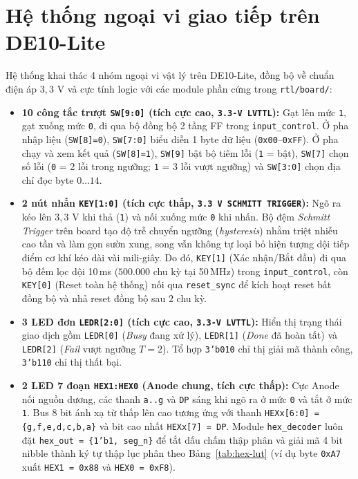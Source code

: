 \documentclass[11pt,a4paper]{report}
\begin{document}
\section{Hệ thống ngoại vi giao tiếp trên DE10-Lite}
\label{sec:peripherals}

Hệ thống khai thác 4 nhóm ngoại vi vật lý trên DE10-Lite, đồng bộ về chuẩn điện áp $3{,}3\text{ V}$ và cực tính logic với các module phần cứng trong \texttt{rtl/board/}:
\begin{itemize}
    \item \textbf{10 công tắc trượt \texttt{SW[9:0]} (tích cực cao, \texttt{3.3-V LVTTL}):} Gạt lên mức \texttt{1}, gạt xuống mức \texttt{0}, đi qua bộ đồng bộ 2 tầng FF trong \texttt{input\_control}. Ở pha nhập liệu (\texttt{SW[8]=0}), \texttt{SW[7:0]} biểu diễn 1 byte dữ liệu (\texttt{0x00}--\texttt{0xFF}). Ở pha chạy và xem kết quả (\texttt{SW[8]=1}), \texttt{SW[9]} bật bộ tiêm lỗi (\texttt{1} = bật), \texttt{SW[7]} chọn số lỗi (\texttt{0} = 2 lỗi trong ngưỡng; \texttt{1} = 3 lỗi vượt ngưỡng) và \texttt{SW[3:0]} chọn địa chỉ đọc byte $0\dots 14$.
    \item \textbf{2 nút nhấn \texttt{KEY[1:0]} (tích cực thấp, \texttt{3.3 V SCHMITT TRIGGER}):} Ngõ ra kéo lên $3{,}3\text{ V}$ khi thả (\texttt{1}) và nối xuống mức \texttt{0} khi nhấn. Bộ đệm \textit{Schmitt Trigger} trên board tạo độ trễ chuyển ngưỡng (\textit{hysteresis}) nhằm triệt nhiễu cao tần và làm gọn sườn xung, song vẫn không tự loại bỏ hiện tượng dội tiếp điểm cơ khí kéo dài vài mili-giây. Do đó, \texttt{KEY[1]} (Xác nhận/Bắt đầu) đi qua bộ đếm lọc dội 10\,ms ($500.000$ chu kỳ tại 50\,MHz) trong \texttt{input\_control}, còn \texttt{KEY[0]} (Reset toàn hệ thống) nối qua \texttt{reset\_sync} để kích hoạt reset bất đồng bộ và nhả reset đồng bộ sau 2 chu kỳ.
    \item \textbf{3 LED đơn \texttt{LEDR[2:0]} (tích cực cao, \texttt{3.3-V LVTTL}):} Hiển thị trạng thái giao dịch gồm \texttt{LEDR[0]} (\textit{Busy} đang xử lý), \texttt{LEDR[1]} (\textit{Done} đã hoàn tất) và \texttt{LEDR[2]} (\textit{Fail} vượt ngưỡng $T=2$). Tổ hợp \texttt{3'b010} chỉ thị giải mã thành công, \texttt{3'b110} chỉ thị thất bại.
    \item \textbf{2 LED 7 đoạn \texttt{HEX1:HEX0} (Anode chung, tích cực thấp):} Cực Anode nối nguồn dương, các thanh \texttt{a..g} và \texttt{DP} sáng khi ngõ ra ở mức \texttt{0} và tắt ở mức \texttt{1}. Bus 8 bit ánh xạ từ thấp lên cao tương ứng với thanh \texttt{HEXx[6:0] = \{g,f,e,d,c,b,a\}} và bit cao nhất \texttt{HEXx[7] = DP}. Module \texttt{hex\_decoder} luôn đặt \texttt{hex\_out = \{1'b1, seg\_n\}} để tắt dấu chấm thập phân và giải mã 4 bit nibble thành ký tự thập lục phân theo Bảng~\ref{tab:hex-lut} (ví dụ byte \texttt{0xA7} xuất \texttt{HEX1 = 0x88} và \texttt{HEX0 = 0xF8}).
\end{itemize}
\end{document}

